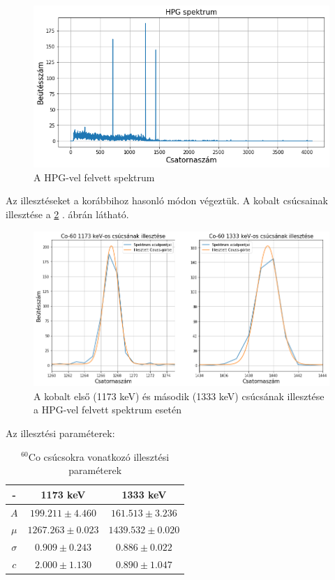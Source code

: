 \documentclass[12pt,a4paper]{article}
\begin{document}
\begin{figure}[!h]
\centering
\includegraphics[scale=0.60]{HPG}
\caption{A HPG-vel felvett spektrum}
\label{fig:7}
\end{figure}

Az illesztéseket a korábbihoz hasonló módon végeztük. A kobalt csúcsainak illesztése a \ref{fig:8} . ábrán látható.

\begin{figure}[!h]
\centering
\includegraphics[scale=0.50]{Co_hpg}
\caption{A kobalt első (1173 keV) és második (1333 keV) csúcsának illesztése a HPG-vel felvett spektrum esetén}
\label{fig:8}
\end{figure}

\newpage

Az illesztési paraméterek:

\begin{table}[!h]
\begin{center}
\begin{tabular}{|c|c||c|}
\hline
- & 1173 keV & 1333 keV \\
\hline
$A$ & $199.211 \pm 4.460$ & $161.513 \pm 3.236$ \\
\hline
$\mu$ & $1267.263 \pm 0.023$ & $1439.532 \pm 0.020$ \\ 
\hline
$\sigma$ & $0.909 \pm 0.243$ & $0.886 \pm 0.022$ \\
\hline
$c$ & $2.000 \pm 1.130$ & $0.890 \pm 1.047$ \\
\hline
\end{tabular}
\caption{$^{60}$Co csúcsokra vonatkozó illesztési paraméterek}
\end{center}
\end{table}
\end{document}
